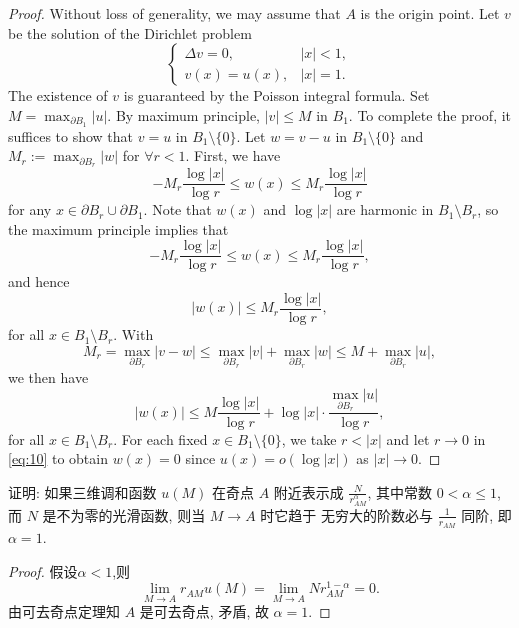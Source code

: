 \begin{proof}
  Without loss of generality, we may assume that $A$ is the origin point.
  Let $v$ be the solution of the Dirichlet problem
  \[\begin{cases}
    \Delta v = 0, & |x|<1, \\
    v(x) = u(x), &  |x|=1.
  \end{cases}\]
  The existence of $v$ is guaranteed by the Poisson integral formula.
  Set $M = \max_{\partial B_1} |u|$. By maximum principle, $|v|\leq M$ in $B_1$.
  To complete the proof, it suffices to show that $v = u$ in $B_1\setminus \{0\}$.
  Let $w = v-u$ in $B_1\setminus \{0\}$ and $M_r:=\max_{\partial B_r} |w|$ for
  $\forall r<1$. First, we have
  \begin{equation}\label{eq:7}
    - M_r \frac{\log |x|}{\log r} \leq w(x) \leq M_r \frac{\log |x|}{\log r}
  \end{equation}
  for any $x\in \partial B_r\cup\partial B_1$.
  Note that $w(x)$ and $\log |x|$ are harmonic in $B_1\setminus B_r$,
  so the maximum principle implies that
  \[ - M_r \frac{\log |x|}{\log r} \leq w(x) \leq M_r \frac{\log |x|}{\log r}, \]
  and hence
  \begin{equation}\label{eq:8}
    |w(x)| \leq M_r \frac{\log |x|}{\log r},
  \end{equation}
  for all $x\in B_1\setminus B_r$. With
  \begin{equation}\label{eq:9}
    M_r = \max_{\partial B_r} |v-w| \leq \max_{\partial B_r} |v|
      + \max_{\partial B_r} |w|
      \leq M + \max_{\partial B_r} |u|,
  \end{equation}
  we then have
  \begin{equation}\label{eq:10}
    |w(x)| \leq M \frac{\log |x|}{\log r}
      + \log |x| \cdot \frac{\max_{\partial B_r} |u|}{\log r},
  \end{equation}
  for all $x\in B_1\setminus B_r$. For each fixed $x\in B_1\setminus \{0\}$,
  we take $r<|x|$ and let $r\to 0$ in \eqref{eq:10}
  to obtain $w(x) = 0$ since $u(x) = o(\log |x|)$ as $|x|\to 0$.
\end{proof}


\begin{exercise}
  证明: 如果三维调和函数 $u(M)$ 在奇点 $A$ 附近表示成 $\frac{N}{r_{AM}^{\alpha}}$,
  其中常数 $0<\alpha\leq 1$, 而 $N$ 是不为零的光滑函数, 则当 $M\to A$ 时它趋于
  无穷大的阶数必与 $\frac{1}{r_{AM}}$ 同阶, 即 $\alpha=1$.
\end{exercise}

\begin{proof}
  假设$\alpha<1$,则
  \[\lim_{M\to A}r_{AM}u(M) = \lim_{M\to A}Nr_{AM}^{1-\alpha} = 0.\]
  由可去奇点定理知 $A$ 是可去奇点, 矛盾, 故 $\alpha=1$.
\end{proof}


